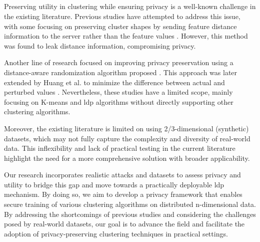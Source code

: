 \newpage

\subsection*{}
Preserving utility in clustering while ensuring privacy is a well-known challenge in the existing literature.
Previous studies have attempted to address this issue, with some focusing on preserving cluster shapes by sending feature distance information to the server rather than the feature values \citep{sun_distributed_2019}.
However, this method was found to leak distance information, compromising privacy.

Another line of research focused on improving privacy preservation using a distance-aware randomization algorithm proposed \citep{xia_distributed_2020}.
This approach was later extended by Huang et al. to minimize the difference between actual and perturbed values \citep{9679364}.
Nevertheless, these studies have a limited scope, mainly focusing on K-means and \gls{ldp} algorithms without directly supporting other clustering algorithms.

Moreover, the existing literature is limited on using 2/3-dimensional (synthetic) datasets, which may not fully capture the complexity and diversity of real-world data.
This inflexibility and lack of practical testing in the current literature highlight the need for a more comprehensive solution with broader applicability.

Our research incorporates realistic attacks and datasets to assess privacy and utility to bridge this gap and move towards a practically deployable \gls{ldp} mechanism.
By doing so, we aim to develop a privacy framework that enables secure training of various clustering algorithms on distributed n-dimensional data.
By addressing the shortcomings of previous studies and considering the challenges posed by real-world datasets, our goal is to advance the field and facilitate the adoption of privacy-preserving clustering techniques in practical settings.

